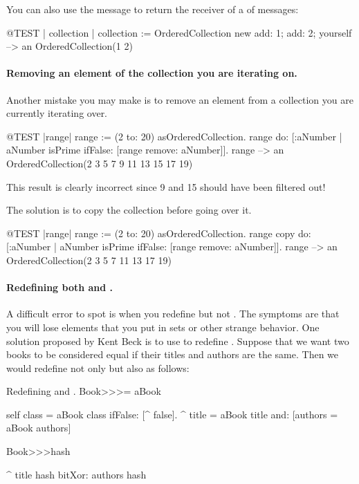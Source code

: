 \documentclass[a4paper,10pt,twoside]{book}
\begin{document}
You can also use the message  to return the receiver of a  of messages:

\begin{code}{@TEST | collection |}
collection := OrderedCollection new add: 1; add: 2; yourself --> an OrderedCollection(1 2)
\end{code}

\paragraph{Removing an element of the collection you are iterating on.}
Another mistake you may make is to remove an element from a collection you are currently iterating over.
\begin{code}{@TEST |range|}
range := (2 to: 20) asOrderedCollection.
range do: [:aNumber | aNumber isPrime ifFalse: [range remove: aNumber]].
range --> an OrderedCollection(2 3 5 7 9 11 13 15 17 19)
\end{code}
\noindent
This result is clearly incorrect since 9 and 15 should have been filtered out!

The solution is to copy the collection before going over it.
\begin{code}{@TEST |range|}
range := (2 to: 20) asOrderedCollection.
range copy do: [:aNumber | aNumber isPrime ifFalse: [range remove: aNumber]].
range --> an OrderedCollection(2 3 5 7 11 13 17 19)
\end{code}

\paragraph{Redefining both \ct{=} and .}
A difficult error to spot is when you redefine  but not .
The symptoms are that you will lose elements that you put in sets or other strange behavior.
One solution proposed by Kent Beck is to use  to redefine .
Suppose that we want two books to be considered equal if their titles and authors are the same.
Then we would redefine not only \ct{=} but also  as follows:

\begin{method}{Redefining \lct{=} and .}
Book>>>= aBook

   self class = aBook class ifFalse: [^ false].
   ^ title = aBook title and: [authors = aBook authors]


Book>>>hash

   ^ title hash bitXor: authors hash
\end{method}
\end{document}
